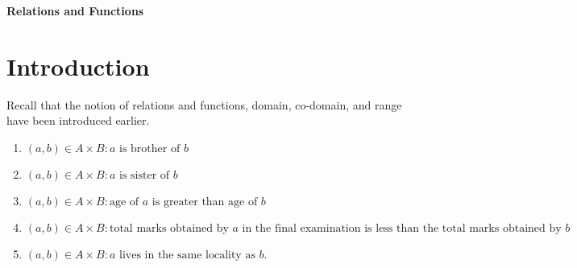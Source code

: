 \usepackage{listings}  %

\newcommand{\solution}{\noindent \textbf{Solution: }}
\newcommand{\myvec}[1]{\ensuremath{\begin{bmatrix} #1 \end{bmatrix}}}
\providecommand{\norm}[1]{\left\lVert#1\right\rVert}



\begin{center}                                                                     \Large \textbf{Relations and Functions}                                    \end{center}
                                                                               \section{Introduction}
Recall that the notion of relations and functions, domain, co-domain, and range have been introduced earlier.                                                                                                                                \begin{enumerate}                                                                  \item ${(a, b) \in A \times B: a \text{ is brother of } b}$                    \item ${(a, b) \in A \times B: a \text{ is sister of } b}$
    \item ${(a, b) \in A \times B: \text{age of } a \text{ is greater than age of } b}$
    \item ${(a, b) \in A \times B: \text{total marks obtained by } a \text{ in the final examination is less than the total marks obtained by } b}$
    \item ${(a, b) \in A \times B: a \text{ lives in the same locality as } b}$.                                                                              \end{enumerate}
